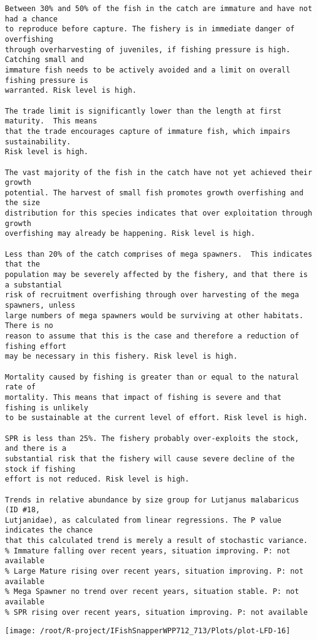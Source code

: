 \documentclass{report}\usepackage[]{graphicx}\usepackage[]{color}
\makeatletter
\def\maxwidth{ %
  \ifdim\Gin@nat@width>\linewidth
    \linewidth
  \else
    \Gin@nat@width
  \fi
}
\newenvironment{kframe}{%
 \def\at@end@of@kframe{}%
 \ifinner\ifhmode%
  \def\at@end@of@kframe{\end{minipage}}%
  \begin{minipage}{\columnwidth}%
 \fi\fi%
 \def\FrameCommand##1{\hskip\@totalleftmargin \hskip-\fboxsep
 \colorbox{shadecolor}{##1}\hskip-\fboxsep
     \hskip-\linewidth \hskip-\@totalleftmargin \hskip\columnwidth}%
 \MakeFramed {\advance\hsize-\width
   \@totalleftmargin\z@ \linewidth\hsize
   \@setminipage}}%
 {\par\unskip\endMakeFramed%
 \at@end@of@kframe}
\newenvironment{knitrout}{}{} %
\makeatother
\begin{document}
\begin{knitrout}
\begin{kframe}
\begin{verbatim}
Between 30% and 50% of the fish in the catch are immature and have not had a chance
to reproduce before capture. The fishery is in immediate danger of overfishing
through overharvesting of juveniles, if fishing pressure is high.  Catching small and
immature fish needs to be actively avoided and a limit on overall fishing pressure is
warranted. Risk level is high.

The trade limit is significantly lower than the length at first maturity.  This means
that the trade encourages capture of immature fish, which impairs sustainability.
Risk level is high.

The vast majority of the fish in the catch have not yet achieved their growth
potential. The harvest of small fish promotes growth overfishing and the size
distribution for this species indicates that over exploitation through growth
overfishing may already be happening. Risk level is high.

Less than 20% of the catch comprises of mega spawners.  This indicates that the
population may be severely affected by the fishery, and that there is a substantial
risk of recruitment overfishing through over harvesting of the mega spawners, unless
large numbers of mega spawners would be surviving at other habitats. There is no
reason to assume that this is the case and therefore a reduction of fishing effort
may be necessary in this fishery. Risk level is high.
 
Mortality caused by fishing is greater than or equal to the natural rate of
mortality. This means that impact of fishing is severe and that fishing is unlikely
to be sustainable at the current level of effort. Risk level is high.
 
SPR is less than 25%. The fishery probably over-exploits the stock, and there is a
substantial risk that the fishery will cause severe decline of the stock if fishing
effort is not reduced. Risk level is high.
 
Trends in relative abundance by size group for Lutjanus malabaricus (ID #18,
Lutjanidae), as calculated from linear regressions. The P value indicates the chance
that this calculated trend is merely a result of stochastic variance.
% Immature falling over recent years, situation improving. P: not available
% Large Mature rising over recent years, situation improving. P: not available
% Mega Spawner no trend over recent years, situation stable. P: not available
% SPR rising over recent years, situation improving. P: not available
\end{verbatim}
\end{kframe}
\texttt{[image: /root/R-project/IFishSnapperWPP712\_713/Plots/plot-LFD-16]} 


\end{knitrout}
\end{document}
